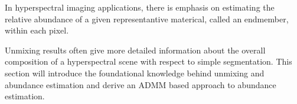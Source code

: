 In hyperspectral imaging applications, there is emphasis on estimating the relative abundance of a given representantive materical, called an endmember, within each pixel. 

Unmixing results often give more detailed information about the overall composition of a hyperspectral scene with respect to simple segmentation. This section will introduce the foundational knowledge behind unmixing and abundance estimation and derive an ADMM based approach to abundance estimation. 

